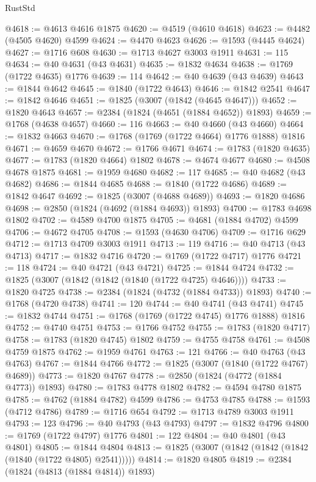 \begin{lexlean}{RustStd}
\begin{coremodule}
@4618 := @4613 @4616 @1875
@4620 := @4519 (@4610 @4618)
@4623 := @4482 (@4505 @4620) @4599
@4624 := @4470 @4623
@4626 := @1593 (@4445 @4624)
@4627 := @1716 @608
@4630 := @1713 @4627 @3003 @1911
@4631 := 115
@4634 := @40 @4631 (@43 @4631)
@4635 := @1832 @4634
@4638 := @1769 (@1722 @4635) @1776
@4639 := 114
@4642 := @40 @4639 (@43 @4639)
@4643 := @1844 @4642
@4645 := @1840 (@1722 @4643)
@4646 := @1842 @2541
@4647 := @1842 @4646
@4651 := @1825 (@3007 (@1842 (@4645 @4647)))
@4652 := @1820 @4643
@4657 := @2384 (@1824 (@4651 (@1884 @4652)) @1893)
@4659 := @1768 (@4638 @4657)
@4660 := 116
@4663 := @40 @4660 (@43 @4660)
@4664 := @1832 @4663
@4670 := @1768 (@1769 (@1722 @4664) @1776 @1888) @1816
@4671 := @4659 @4670
@4672 := @1766 @4671
@4674 := @1783 (@1820 @4635)
@4677 := @1783 (@1820 @4664) @1802
@4678 := @4674 @4677
@4680 := @4508 @4678 @1875
@4681 := @1959 @4680
@4682 := 117
@4685 := @40 @4682 (@43 @4682)
@4686 := @1844 @4685
@4688 := @1840 (@1722 @4686)
@4689 := @1842 @4647
@4692 := @1825 (@3007 (@4688 @4689))
@4693 := @1820 @4686
@4698 := @2850 (@1824 (@4692 (@1884 @4693)) @1893)
@4700 := @1783 @4698 @1802
@4702 := @4589 @4700 @1875
@4705 := @4681 (@1884 @4702) @4599
@4706 := @4672 @4705
@4708 := @1593 (@4630 @4706)
@4709 := @1716 @629
@4712 := @1713 @4709 @3003 @1911
@4713 := 119
@4716 := @40 @4713 (@43 @4713)
@4717 := @1832 @4716
@4720 := @1769 (@1722 @4717) @1776
@4721 := 118
@4724 := @40 @4721 (@43 @4721)
@4725 := @1844 @4724
@4732 := @1825 (@3007 (@1842 (@1842 (@1840 (@1722 @4725) @4646))))
@4733 := @1820 @4725
@4738 := @2384 (@1824 (@4732 (@1884 @4733)) @1893)
@4740 := @1768 (@4720 @4738)
@4741 := 120
@4744 := @40 @4741 (@43 @4741)
@4745 := @1832 @4744
@4751 := @1768 (@1769 (@1722 @4745) @1776 @1888) @1816
@4752 := @4740 @4751
@4753 := @1766 @4752
@4755 := @1783 (@1820 @4717)
@4758 := @1783 (@1820 @4745) @1802
@4759 := @4755 @4758
@4761 := @4508 @4759 @1875
@4762 := @1959 @4761
@4763 := 121
@4766 := @40 @4763 (@43 @4763)
@4767 := @1844 @4766
@4772 := @1825 (@3007 (@1840 (@1722 @4767) @4689))
@4773 := @1820 @4767
@4778 := @2850 (@1824 (@4772 (@1884 @4773)) @1893)
@4780 := @1783 @4778 @1802
@4782 := @4594 @4780 @1875
@4785 := @4762 (@1884 @4782) @4599
@4786 := @4753 @4785
@4788 := @1593 (@4712 @4786)
@4789 := @1716 @654
@4792 := @1713 @4789 @3003 @1911
@4793 := 123
@4796 := @40 @4793 (@43 @4793)
@4797 := @1832 @4796
@4800 := @1769 (@1722 @4797) @1776
@4801 := 122
@4804 := @40 @4801 (@43 @4801)
@4805 := @1844 @4804
@4813 := @1825 (@3007 (@1842 (@1842 (@1842 (@1840 (@1722 @4805) @2541)))))
@4814 := @1820 @4805
@4819 := @2384 (@1824 (@4813 (@1884 @4814)) @1893)

\end{coremodule}
\end{lexlean}
